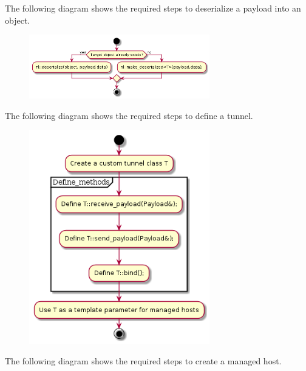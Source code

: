 \documentclass[12pt]{report}
\newcommand{\+}{\discretionary{\mbox{\scriptsize$\hookleftarrow$}}{}{}}
\begin{document}
                \newpage
                The following diagram shows the required steps to deserialize a payload into an object.

                \begin{figure}[H]
                \centering
                \includegraphics[width=0.7\textwidth]{d/ac/def_deserialize_obj.png}
                \end{figure}





                \newpage
                The following diagram shows the required steps to define a tunnel.

                \begin{figure}[H]
                \centering
                \includegraphics[width=0.7\textwidth]{d/ac/def_tunnel.png}
                \end{figure}






                \newpage
                The following diagram shows the required steps to create a managed host.
\end{document}

